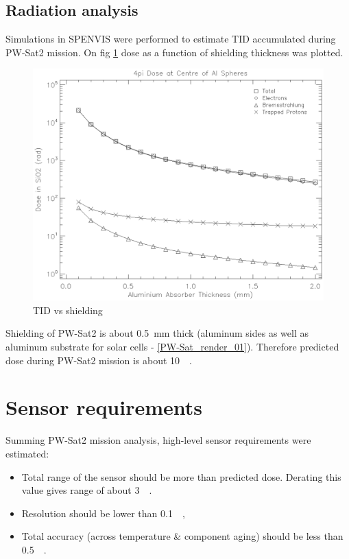     \subsection{Radiation analysis}
        Simulations in SPENVIS \cite{SPENVIS_URL} were performed to estimate TID accumulated during PW-Sat2 mission. On fig \ref{TIDvsSheilding} dose as a function of shielding thickness was plotted.

        \begin{figure}[H]
            \centering
            \includegraphics[width=0.7\paperwidth]{img/dose.eps}
            \caption{TID vs shielding}
            \label{TIDvsSheilding}
        \end{figure}

        Shielding of PW-Sat2 is about \SI{0.5}{\milli\meter} thick (aluminum sides as well as aluminum substrate for solar cells - \ref{PW-Sat_render_01}). Therefore predicted dose during PW-Sat2 mission is about \SI{10}{\kilo\rad}.

\section{Sensor requirements}
    Summing PW-Sat2 mission analysis, high-level sensor requirements were estimated:

    \begin{itemize}
        \item Total range of the sensor should be more than predicted dose. Derating this value gives range of about \SI{3}{\kilo\rad}.

        \item Resolution should be lower than \SI{0.1}{\kilo\rad},

        \item Total accuracy (across temperature \& component aging) should be less than \SI{0.5}{\kilo\rad}.
    \end{itemize}

